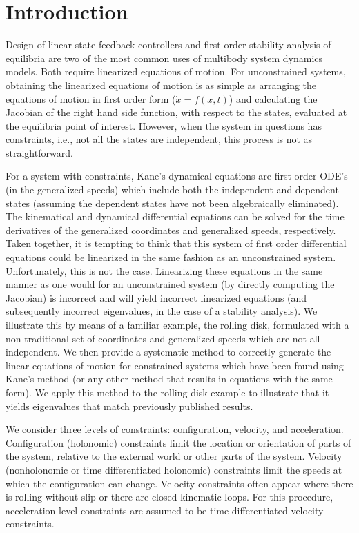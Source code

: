 \documentclass[smallcondensed,final]{svjour3}                     %
\begin{document}
\section{Introduction}
\label{sec:intro}
Design of linear state feedback controllers and first order stability analysis
of equilibria are two of the most common uses of multibody system dynamics
models. Both require linearized equations of motion. For unconstrained systems,
obtaining the linearized equations of motion is as simple as arranging the
equations of motion in first order form ($\dot{x} = f(x, t)$) and calculating
the Jacobian of the right hand side function, with respect to the states,
evaluated at the equilibria point of interest.  However, when the system in
questions has constraints, i.e., not all the states are independent, this
process is not as straightforward.

For a system with constraints, Kane's dynamical equations\cite{Kane1985} are
first order ODE's (in the generalized speeds) which include both the
independent and dependent states (assuming the dependent states have not been
algebraically eliminated). The kinematical and dynamical differential equations
can be solved for the time derivatives of the generalized coordinates and
generalized speeds, respectively. Taken together, it is tempting to think that
this system of first order differential equations could be linearized in the
same fashion as an unconstrained system.  Unfortunately, this is not the case.
Linearizing these equations in the same manner as one would for an
unconstrained system (by directly computing the Jacobian) is incorrect and will
yield incorrect linearized equations (and subsequently incorrect eigenvalues,
in the case of a stability analysis). We illustrate this by means of a familiar
example, the rolling disk, formulated with a non-traditional set of coordinates
and generalized speeds which are not all independent. We then provide a
systematic method to correctly generate the linear equations of motion for
constrained systems which have been found using Kane's method (or any other
method that results in equations with the same form). We apply this method to
the rolling disk example to illustrate that it yields eigenvalues that match
previously published results.

We consider three levels of constraints: configuration, velocity, and
acceleration. Configuration (holonomic) constraints limit the location or
orientation of parts of the system, relative to the external world or other
parts of the system. Velocity (nonholonomic or time differentiated holonomic)
constraints limit the speeds at which the configuration can change.
Velocity constraints often appear where there is rolling without slip or there
are closed kinematic loops. For this procedure, acceleration level constraints
are assumed to be time differentiated velocity constraints.
\end{document}
